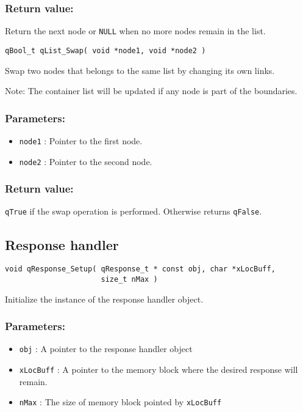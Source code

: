 \subsubsection*{Return value:}
Return the next node or \lstinline{NULL} when no more nodes remain in the list. 

\noindent\hrulefill

\begin{lstlisting}[style=CStyle]
qBool_t qList_Swap( void *node1, void *node2 )
\end{lstlisting} 

Swap two nodes that belongs to the same list by changing its own links.

Note: The container list will be updated if any node is part of the boundaries.

\subsubsection*{Parameters:}
\begin{itemize}
    \item \lstinline{node1} : Pointer to the first node.
    \item \lstinline{node2} : Pointer to the second node.
\end{itemize}

\subsubsection*{Return value:}
\lstinline{qTrue} if the swap operation is performed. Otherwise returns \lstinline{qFalse}.


\subsection{Response handler}

\begin{lstlisting}[style=CStyle]
void qResponse_Setup( qResponse_t * const obj, char *xLocBuff, 
                      size_t nMax )
\end{lstlisting}

Initialize the instance of the response handler object. 

\subsubsection*{Parameters:}
\begin{itemize}
    \item \lstinline{obj} : A pointer to the response handler object
    \item \lstinline{xLocBuff} : A pointer to the memory block where the desired response will remain.
    \item \lstinline{nMax} : The size of memory block pointed by \lstinline{xLocBuff}
\end{itemize}

